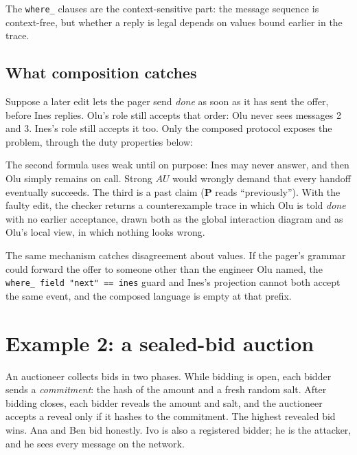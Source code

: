 The \texttt{where\_} clauses are the context-sensitive part: the message
sequence is context-free, but whether a reply is legal depends on values bound
earlier in the trace.

\subsection{What composition catches}

Suppose a later edit lets the pager send \emph{done} as soon as it has sent the
offer, before Ines replies. Olu's role still accepts that order: Olu never sees
messages 2 and 3. Ines's role still accepts it too. Only the composed protocol
exposes the problem, through the duty properties below:




The second formula uses weak until on purpose: Ines may never answer, and then
Olu simply remains on call. Strong $AU$ would wrongly demand that every handoff
eventually succeeds. The third is a past claim ($\mathbf{P}$ reads ``previously'').
With the faulty edit, the checker returns a counterexample trace in which Olu
is told \emph{done} with no earlier acceptance, drawn both as the global
interaction diagram and as Olu's local view, in which nothing looks wrong.

The same mechanism catches disagreement about values. If the pager's grammar
could forward the offer to someone other than the engineer Olu named, the
\texttt{where\_ field "next" == ines} guard and Ines's projection cannot both
accept the same event, and the composed language is empty at that prefix.

\section{Example 2: a sealed-bid auction}

An auctioneer collects bids in two phases. While bidding is open, each bidder
sends a \emph{commitment}: the hash of the amount and a fresh random salt. After
bidding closes, each bidder reveals the amount and salt, and the auctioneer
accepts a reveal only if it hashes to the commitment. The highest revealed bid
wins. Ana and Ben bid honestly. Ivo is also a registered bidder; he is the
attacker, and he sees every message on the network.

